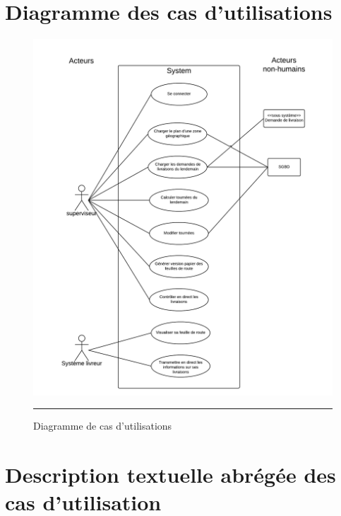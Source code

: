 \section{Diagramme des cas d'utilisations}
\begin{figure}[htbp]
	\centering
		\includegraphics[width=\textwidth,height=\textheight,keepaspectratio]{Figures/cu}
		\rule{35em}{0.5pt}
	\caption[Diagramme des cas d'utilisations]{Diagramme de cas d'utilisations}
\end{figure}
\section{Description textuelle abrégée des cas d'utilisation}
